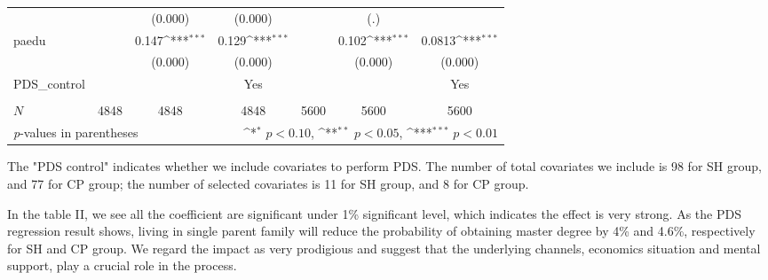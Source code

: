 \documentclass[]{AEA}
\def\sym#1{\ifmmode^{#1}\else\(^{#1}\)\fi}
\begin{document}
\begin{center}
\begin{table}
\begin{tabular}{l*{6}c}
                &                     &     (0.000)         &     (0.000)         &                     &         (.)         &                     \\
    [1em]
    paedu       &                     &       0.147\sym{***}&       0.129\sym{***}&                     &       0.102\sym{***}&      0.0813\sym{***}\\
            &                     &     (0.000)         &     (0.000)         &                     &     (0.000)         &     (0.000)         \\
    [1em]
    PDS\_control  &   &  &  Yes    &  &    &  Yes \\
    &   &      &      &   &      &      \\
    \hline
    \(N\)       &        4848         &        4848         &        4848         &        5600         &        5600         &        5600         \\
    \bottomrule
    \multicolumn{3}{l}{\footnotesize \textit{p}-values in parentheses} & \multicolumn{4}{r}{\footnotesize \sym{*} \(p<0.10\), \sym{**} \(p<0.05\), \sym{***} \(p<0.01\)}\\
    \end{tabular}
    \begin{tablenotes}
        The "PDS control" indicates whether we include covariates to perform PDS.  The number of total covariates we include is 98 for SH group, and 77 for CP group; the number of selected covariates is 11 for SH group, and 8 for CP group.
    \end{tablenotes}
    \end{table}
    \end{center}

    In the table II, we see all the coefficient are significant under 1\% significant level, which indicates the effect is very strong.  As the PDS regression result shows, living in single parent family will reduce the probability of obtaining master degree by 4\% and 4.6\%, respectively for SH and CP group.  We regard the impact as very prodigious and suggest that the underlying channels, economics situation and mental support, play a crucial role in the process.
\end{document}
